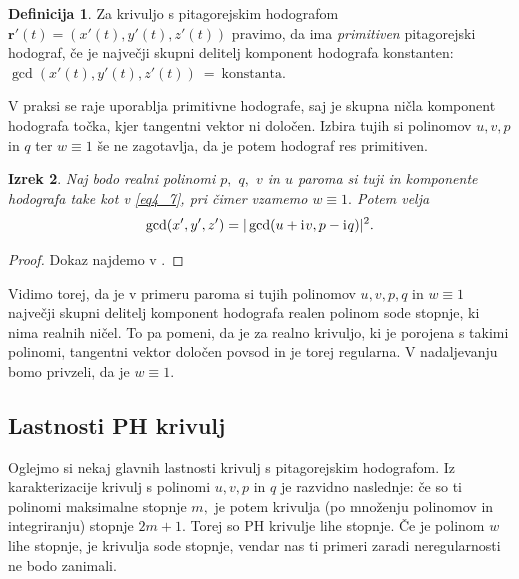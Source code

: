 \documentclass[12pt,a4paper,twoside]{article}
\newcommand{\iu}{\mathrm{i}\mkern1mu} %
\theoremstyle{definition} %
\newtheorem{definicija}{Definicija}[section]
\theoremstyle{plain} %
\newtheorem{izrek}[definicija]{Izrek}
\theoremstyle{primerstyle}
\numberwithin{equation}{section}  %
\newcommand{\rV}{\mathbf{r}}
\begin{document}
\begin{definicija}
	\label{primitiven_hodo}
	Za krivuljo s pitagorejskim hodografom $\rV'(t)=(x'(t),y'(t),z'(t))$ pravimo, da ima \emph{primitiven} pitagorejski hodograf, če je največji skupni delitelj komponent hodografa konstanten: $\gcd(x'(t),y'(t),z'(t))~=~\mathrm{konstanta}.$
\end{definicija}

V praksi se raje uporablja primitivne hodografe, saj je skupna ničla komponent hodografa točka, kjer tangentni vektor ni določen. Izbira tujih si polinomov $u,v,p$ in $q$ ter $w\equiv 1$ še ne zagotavlja, da je potem hodograf res primitiven. 

\begin{izrek}
	Naj bodo realni polinomi $p,$ $q,$ $v$ in $u$ paroma si tuji in komponente hodografa take kot v \eqref{eq4_7}, pri čimer vzamemo $w\equiv 1.$ Potem velja
	\begin{equation}
		\gcd(x',y',z')=|\gcd(u+\iu v,p-\iu q)|^2.
	\end{equation}
\end{izrek}
\begin{proof}
	Dokaz najdemo v \cite{faroukietal2004}.
\end{proof}

Vidimo torej, da je v primeru paroma si tujih polinomov $u,v,p,q$ in $w\equiv 1$ največji skupni delitelj komponent hodografa realen polinom sode stopnje, ki nima realnih ničel. To pa pomeni, da je za realno krivuljo, ki je porojena s takimi polinomi, tangentni vektor določen povsod in je torej regularna. V nadaljevanju bomo privzeli, da je $w\equiv 1.$

\subsection{Lastnosti PH krivulj}
\label{subsec_lastnosti}

Oglejmo si nekaj glavnih lastnosti krivulj s pitagorejskim hodografom. Iz karakterizacije krivulj s polinomi $u,v,p$ in $q$ je razvidno naslednje: če so ti polinomi maksimalne stopnje $m,$ je potem krivulja (po množenju polinomov in integriranju) stopnje $2m+1.$ Torej so PH krivulje lihe stopnje. Če je polinom $w$ lihe stopnje, je krivulja sode stopnje, vendar nas ti primeri zaradi neregularnosti ne bodo zanimali.
\end{document}
